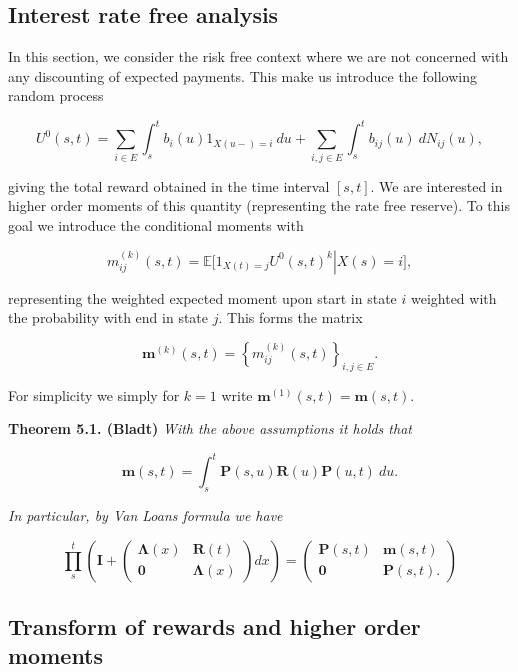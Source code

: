 \documentclass[a4paper,10pt,openany]{book}
\begin{document}
\hypertarget{interest-rate-free-analysis}{%
\subsection{Interest rate free analysis}\label{interest-rate-free-analysis}}

In this section, we consider the risk free context where we are not concerned with any discounting of expected payments. This make us introduce the following random process

\[
U^0(s,t) = \sum_{i\in E}\int_s^tb_i(u)1_{X(u-)=i}\ du+\sum_{i,j\in E}\int_s^tb_{ij}(u)\ dN_{ij}(u),
\]

giving the total reward obtained in the time interval \([s,t]\). We are interested in higher order moments of this quantity (representing the rate free reserve). To this goal we introduce the conditional moments with

\[
m_{ij}^{(k)}(s,t)=\mathbb E\left.\Big[1_{X(t)=j}U^0(s,t)^k\right\vert X(s)=i\Big],
\]

representing the weighted expected moment upon start in state \(i\) weighted with the probability with end in state \(j\). This forms the matrix

\[
\mathbf m^{(k)}(s,t)=\left\{m_{ij}^{(k)}(s,t)\right\}_{i,j\in E}.
\]

For simplicity we simply for \(k=1\) write \(\mathbf m^{(1)}(s,t) = \mathbf m(s,t)\).

\textbf{Theorem 5.1. (Bladt)} \emph{With the above assumptions it holds that}

\[
\mathbf m(s,t)=\int_s^t\mathbf P(s,u)\mathbf R(u)\mathbf P(u,t)\ du.
\]

\emph{In particular, by Van Loans formula we have}

\[
\prod_s^t\left(\mathbf I + \begin{pmatrix}\mathbf \Lambda(x) & \mathbf R(t)\\ \mathbf 0 & \mathbf \Lambda(x)\end{pmatrix} dx\right)=
\begin{pmatrix}
\mathbf P(s,t) & \mathbf m(s,t)\\
\mathbf 0 & \mathbf P(s,t).
\end{pmatrix}
\]

\hypertarget{transform-of-rewards-and-higher-order-moments}{%
\subsection{Transform of rewards and higher order moments}\label{transform-of-rewards-and-higher-order-moments}}
\end{document}
